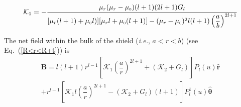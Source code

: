 


\begin{equation}\label{k1}
\mathcal{K}_1=-\frac{\mu_r(\mu_r-\mu_{\scriptscriptstyle 0})(l+1) (2l+1)G_l}{[\mu_r(l+1)+\mu_{\scriptscriptstyle 0} l)][\mu_r l+\mu_{\scriptscriptstyle 0}(l+1)]-(\mu_r-\mu_{\scriptscriptstyle 0})^2 l(l+1)\left(\dfrac{a}{b}\right)^{2l+1}}
\end{equation}


The net field  within the bulk of the shield (\textit{i.e.}, $a<r<b$) (see Eq.~(\ref{R<r<R+t}))  is 
\begin{multline}\label{B2}
\bm B= l(l+1)r^{l-1}\left[\mathcal{K}_1 \left(\dfrac{a}{r}\right)^{2l+1}+(\mathcal{K}_2+G_l)\right] P_l(u) \bm{\hat{r}} \\+r^{l-1} \left[\mathcal{K}_1 l\left(\dfrac{a}{r}\right)^{2l+1}-(\mathcal{K}_2+G_l)(l+1) \right] P_l^1(u) \bm{\hat{\theta}}
\end{multline}



